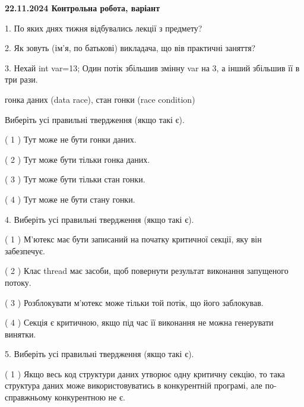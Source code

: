 \documentclass[12pt, ukrainian]{article}
\begin{document}
\vspace{4mm}
\newpage
\begin {large}

\textbf{22.11.2024 Контрольна робота, варіант  }\par


{
1. По яких днях тижня відбувались лекції з предмету?



\vspace{5mm}
2. Як зовуть (ім'я, по батькові) викладача, що вів практичні заняття?



\vspace{5mm}
3. Нехай int var=13; Один потік збільшив змінну var на 3, а інший збільшив її в три рази.

гонка даних (data race), стан гонки (race condition)

Виберіть усі правильні твердження (якщо такі є).\par
\vspace{2mm}
( 1 ) Тут може не бути гонки даних.%

( 2 ) Тут може бути тільки гонка даних.%

( 3 ) Тут може бути тільки стан гонки.%

( 4 ) Тут може не бути стану гонки.%


\vspace{5mm}
4. Виберіть усі правильні твердження (якщо такі є).\par
\vspace{2mm}

( 1 ) М’ютекс має бути записаний на початку критичної секції, яку він забезпечує.%

( 2 ) Клас thread має засоби, щоб повернути результат виконання запущеного потоку.%

( 3 ) Розблокувати м’ютекс може тільки той потік, що його заблокував.%

( 4 ) Секція є критичною, якщо під час її виконання не можна генерувати винятки.%


\vspace{5mm}
5. Виберіть усі правильні твердження (якщо такі є).\par
\vspace{2mm}

( 1 ) Якщо весь код структури даних утворює одну критичну секцію, то така структура даних може використовуватись в конкурентній програмі, але по-справжньо\-му конкурентною не є.%

}
\end{large}
\end{document}
